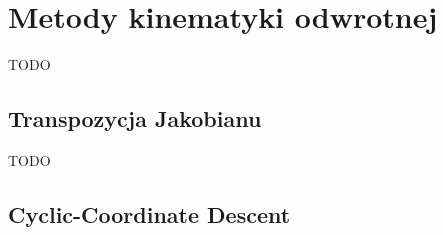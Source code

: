 \documentclass[11pt]{mwrep}
\begin{document}
% 
% 

  \section{Metody kinematyki odwrotnej}

    TODO


    \subsection{Transpozycja Jakobianu}

     TODO
 
    \subsection{Cyclic-Coordinate Descent}
\end{document}
